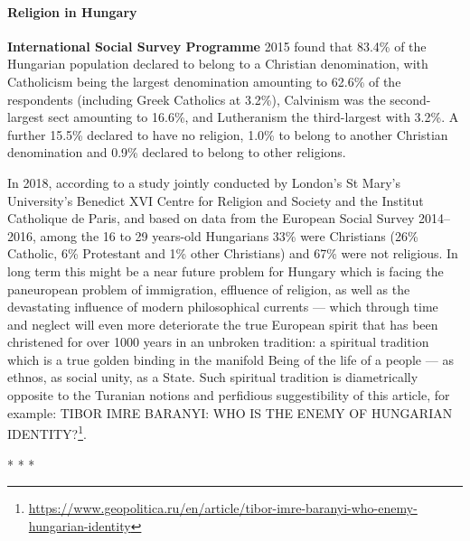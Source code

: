 \paragraph{Religion in Hungary}


\textbf{International Social Survey Programme} 2015 found that 83.4\% of the Hungarian population declared to belong to a Christian denomination, with Catholicism being the largest denomination amounting to 62.6\% of the respondents (including Greek Catholics at 3.2\%), Calvinism was the second-largest sect amounting to 16.6\%, and Lutheranism the third-largest with 3.2\%. A further 15.5\% declared to have no religion, 1.0\% to belong to another Christian denomination and 0.9\% declared to belong to other religions.

In 2018, according to a study jointly conducted by London's St Mary's University's Benedict XVI Centre for Religion and Society and the Institut Catholique de Paris, and based on data from the European Social Survey 2014--2016, among the 16 to 29 years-old Hungarians 33\% were Christians (26\% Catholic, 6\% Protestant and 1\% other Christians) and 67\% were not religious. In long term this might be a near future problem for Hungary which is facing the paneuropean problem of immigration, effluence of religion, as well as the devastating influence of modern philosophical currents --- which through time and neglect will even more deteriorate the true European spirit that has been christened for over 1000 years in an unbroken tradition: a spiritual tradition which is a true golden binding in the manifold Being of the life of a people --- as ethnos, as social unity, as a State. Such spiritual tradition is diametrically opposite to the Turanian notions and perfidious suggestibility of this article, for example: TIBOR IMRE BARANYI: WHO IS THE ENEMY OF HUNGARIAN IDENTITY?\footnote{\url{https://www.geopolitica.ru/en/article/tibor-imre-baranyi-who-enemy-hungarian-identity}}.



\begin{center}* * *\end{center}

